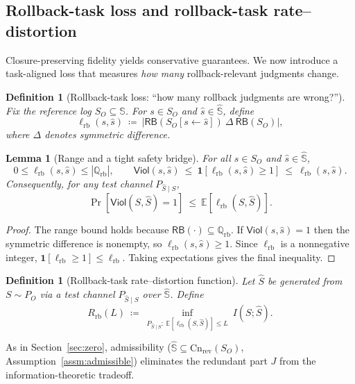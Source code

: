 \documentclass[twoside]{article}
\newtheorem{definition}[theorem]{Definition}
\newtheorem{lemma}[theorem]{Lemma}
\newcommand{\Cn}{\mathrm{Cn}}
\newcommand{\E}{\mathbb{E}}
\newcommand{\1}{\mathbf{1}}
\begin{document}
\subsection{Rollback-task loss and rollback-task rate--distortion}
\label{sec:rb-rd}

Closure-preserving fidelity yields conservative guarantees. We now introduce a task-aligned loss that measures \emph{how many}
rollback-relevant judgments change.

\begin{definition}[Rollback-task loss: ``how many rollback judgments are wrong?'']
\label{def:rb-loss}
Fix the reference log \(S_O\subseteq\mathbb{S}\).
For \(s\in S_O\) and \(\hat s\in \hat{\mathbb{S}}\), define
\[
\ell_{\mathrm{rb}}(s,\hat s)
\ \coloneqq\
\bigl|\mathsf{RB}(S_O[s\leftarrow \hat s])\ \Delta\ \mathsf{RB}(S_O)\bigr|,
\]
where \(\Delta\) denotes symmetric difference.
\end{definition}

\begin{lemma}[Range and a tight safety bridge]
\label{lem:rb-loss-range}
For all \(s\in S_O\) and \(\hat s\in\hat{\mathbb{S}}\),
\[
0\le \ell_{\mathrm{rb}}(s,\hat s)\le |\mathbb Q_{\mathrm{rb}}|,
\qquad
\mathsf{Viol}(s,\hat s)\ \le\ \1[\ell_{\mathrm{rb}}(s,\hat s)\ge 1]\ \le\ \ell_{\mathrm{rb}}(s,\hat s).
\]
Consequently, for any test channel \(P_{\hat S\mid S}\),
\[
\Pr[\mathsf{Viol}(S,\hat S)=1]\ \le\ \E[\ell_{\mathrm{rb}}(S,\hat S)].
\]
\end{lemma}
\begin{proof}
The range bound holds because \(\mathsf{RB}(\cdot)\subseteq\mathbb Q_{\mathrm{rb}}\).
If \(\mathsf{Viol}(s,\hat s)=1\) then the symmetric difference is nonempty, so \(\ell_{\mathrm{rb}}(s,\hat s)\ge 1\).
Since \(\ell_{\mathrm{rb}}\) is a nonnegative integer, \(\1[\ell_{\mathrm{rb}}\ge 1]\le \ell_{\mathrm{rb}}\).
Taking expectations gives the final inequality.
\end{proof}

\begin{definition}[Rollback-task rate--distortion function]
\label{def:Rrb}
Let \(\hat S\) be generated from \(S\sim P_O\) via a test channel \(P_{\hat S\mid S}\) over \(\hat{\mathbb{S}}\).
Define
\[
R_{\mathrm{rb}}(L)
\ \coloneqq\
\inf_{P_{\hat S\mid S}:\ \E[\ell_{\mathrm{rb}}(S,\hat S)]\le L}\ I(S;\hat S).
\]
\end{definition}

As in Section~\ref{sec:zero}, admissibility (\(\hat{\mathbb{S}}\subseteq \Cn_{\mathrm{rev}}(S_O)\), Assumption~\ref{assm:admissible})
eliminates the redundant part \(J\) from the information-theoretic tradeoff.
\end{document}
